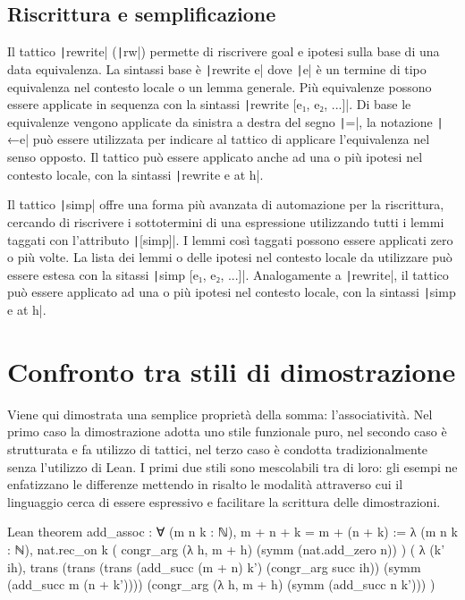 \subsection{Riscrittura e semplificazione}
Il tattico \texttt|rewrite| (\texttt|rw|) permette di riscrivere goal e ipotesi sulla base di una data equivalenza. La sintassi base è \texttt|rewrite e| dove \texttt|e| è un termine di tipo equivalenza nel contesto locale o un lemma generale. Più equivalenze possono essere applicate in sequenza con la sintassi \texttt|rewrite [e₁, e₂, ...]|. Di base le equivalenze vengono applicate da sinistra a destra del segno \texttt|=|, la notazione \texttt|←e| può essere utilizzata per indicare al tattico di applicare l'equivalenza nel senso opposto. Il tattico può essere applicato anche ad una o più ipotesi nel contesto locale, con la sintassi \texttt|rewrite e at h|.

Il tattico \texttt|simp| offre una forma più avanzata di automazione per la riscrittura, cercando di riscrivere i sottotermini di una espressione utilizzando tutti i lemmi taggati con l'attributo \texttt|[simp]|. I lemmi così taggati possono essere applicati zero o più volte. La lista dei lemmi o delle ipotesi nel contesto locale da utilizzare può essere estesa con la sitassi \texttt|simp [e₁, e₂, ...]|. Analogamente a \texttt|rewrite|, il tattico può essere applicato ad una o più ipotesi nel contesto locale, con la sintassi \texttt|simp e at h|.

\section{Confronto tra stili di dimostrazione} \label{conf}
Viene qui dimostrata una semplice proprietà della somma: l'associatività. Nel primo caso la dimostrazione adotta uno stile funzionale puro, nel secondo caso è strutturata e fa utilizzo di tattici, nel terzo caso è condotta tradizionalmente senza l'utilizzo di Lean. I primi due stili sono mescolabili tra di loro: gli esempi ne enfatizzano le differenze mettendo in risalto le modalità attraverso cui il linguaggio cerca di essere espressivo e facilitare la scrittura delle dimostrazioni.

\begin{code}{Lean}
theorem add_assoc : ∀ (m n k : ℕ), m + n + k = m + (n + k) :=
  λ (m n k : ℕ), nat.rec_on k 
    (
      congr_arg (λ h, m + h) (symm (nat.add_zero n))
    )
    (
      λ (k' ih), trans (trans (trans (add_succ (m + n) k') (congr_arg succ ih)) (symm (add_succ m (n + k')))) (congr_arg (λ h, m + h) (symm (add_succ n k')))
    )
\end{code}


